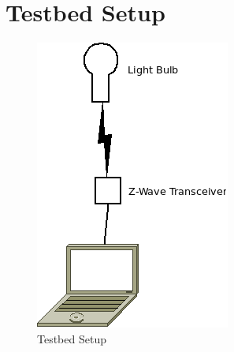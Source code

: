 \section{Testbed Setup}
\label{sec:test}
\begin{figure}[tbh]                                                              
    \centering                                                                   
    \includegraphics[width=0.75\columnwidth]{figs/testbedexp.png}                 
    \caption{Testbed Setup}                                                       
    \label{Fig:testsetup}                                                             
\end{figure} 
